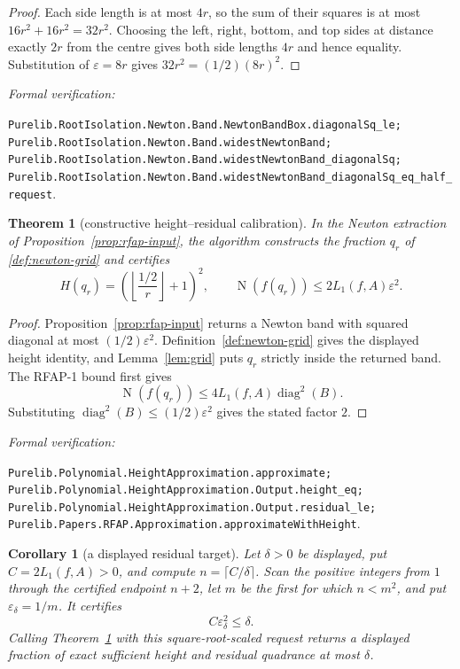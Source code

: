 \documentclass[11pt]{article}
\newtheorem{theorem}{Theorem}[section]
\newtheorem{corollary}[corollary]{Corollary}
\newcommand{\Norm}[1]{\operatorname{N}\!\left(#1\right)}
\newcommand{\diamq}{\operatorname{diag}^{2}}
\newcommand{\eps}{\varepsilon}
\newcommand{\leanref}[1]{\par\smallskip\noindent
  \emph{Formal verification:}\par\nobreak
  {\raggedright\nolinkurl{#1}.\par}}
\begin{document}
\begin{proof}
Each side length is at most $4r$, so the sum of their squares is at most
$16r^2+16r^2=32r^2$.  Choosing the left, right, bottom, and top sides at
distance exactly $2r$ from the centre gives both side lengths $4r$ and hence
equality.  Substitution of $\eps=8r$ gives
$32r^2=(1/2)(8r)^2$.
\end{proof}

\leanref{Purelib.RootIsolation.Newton.Band.NewtonBandBox.diagonalSq_le;
Purelib.RootIsolation.Newton.Band.widestNewtonBand;
Purelib.RootIsolation.Newton.Band.widestNewtonBand_diagonalSq;
Purelib.RootIsolation.Newton.Band.widestNewtonBand_diagonalSq_eq_half_request}

\begin{theorem}[constructive height--residual calibration]
\label{thm:height-upper}
In the Newton extraction of Proposition~\ref{prop:rfap-input}, the algorithm
constructs the fraction $q_r$ of \cref{def:newton-grid} and certifies
\begin{equation}
\label{eq:height-upper}
 H(q_r)=\left(\left\lfloor\frac{1/2}{r}\right\rfloor+1\right)^2,
 \qquad
 \Norm{f(q_r)}\le2L_1(f,A)\eps^2.
\end{equation}
\end{theorem}

\begin{proof}
Proposition~\ref{prop:rfap-input} returns a Newton band with squared diagonal
at most $(1/2)\eps^2$.  Definition~\ref{def:newton-grid} gives the displayed
height identity, and Lemma~\ref{lem:grid} puts $q_r$ strictly inside the
returned band.  The RFAP-1 bound first gives
\[
                    \Norm{f(q_r)}
          \le4L_1(f,A)\diamq(B).
\]
Substituting $\diamq(B)\le(1/2)\eps^2$ gives the stated factor $2$.
\end{proof}

\leanref{Purelib.Polynomial.HeightApproximation.approximate;
Purelib.Polynomial.HeightApproximation.Output.height_eq;
Purelib.Polynomial.HeightApproximation.Output.residual_le;
Purelib.Papers.RFAP.Approximation.approximateWithHeight}

\begin{corollary}[a displayed residual target]
\label{cor:height-target}
Let $\delta>0$ be displayed, put $C=2L_1(f,A)>0$, and compute
$n=\lceil C/\delta\rceil$.  Scan the positive integers from $1$ through the
certified endpoint $n+2$, let $m$ be the first for which $n<m^2$, and put
$\eps_\delta=1/m$.
It certifies
\begin{equation}
\label{eq:target-request}
                         C\eps_\delta^2\le\delta.
\end{equation}
Calling Theorem~\ref{thm:height-upper} with this square-root-scaled request
returns a displayed fraction of exact sufficient height and residual
quadrance at most $\delta$.
\end{corollary}
\end{document}
